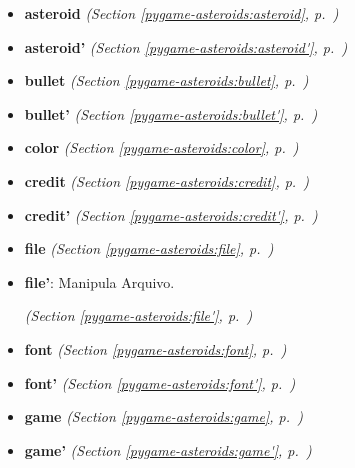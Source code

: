 \begin{itemize}
\setlength{\parskip}{0ex}
\item \textbf{asteroid}
  \textit{(Section \ref{pygame-asteroids:asteroid}, p.~\pageref{pygame-asteroids:asteroid})}

\item \textbf{asteroid'}
  \textit{(Section \ref{pygame-asteroids:asteroid'}, p.~\pageref{pygame-asteroids:asteroid'})}

\item \textbf{bullet}
  \textit{(Section \ref{pygame-asteroids:bullet}, p.~\pageref{pygame-asteroids:bullet})}

\item \textbf{bullet'}
  \textit{(Section \ref{pygame-asteroids:bullet'}, p.~\pageref{pygame-asteroids:bullet'})}

\item \textbf{color}
  \textit{(Section \ref{pygame-asteroids:color}, p.~\pageref{pygame-asteroids:color})}

\item \textbf{credit}
  \textit{(Section \ref{pygame-asteroids:credit}, p.~\pageref{pygame-asteroids:credit})}

\item \textbf{credit'}
  \textit{(Section \ref{pygame-asteroids:credit'}, p.~\pageref{pygame-asteroids:credit'})}

\item \textbf{file}
  \textit{(Section \ref{pygame-asteroids:file}, p.~\pageref{pygame-asteroids:file})}

\item \textbf{file'}: Manipula Arquivo.



  \textit{(Section \ref{pygame-asteroids:file'}, p.~\pageref{pygame-asteroids:file'})}

\item \textbf{font}
  \textit{(Section \ref{pygame-asteroids:font}, p.~\pageref{pygame-asteroids:font})}

\item \textbf{font'}
  \textit{(Section \ref{pygame-asteroids:font'}, p.~\pageref{pygame-asteroids:font'})}

\item \textbf{game}
  \textit{(Section \ref{pygame-asteroids:game}, p.~\pageref{pygame-asteroids:game})}

\item \textbf{game'}
  \textit{(Section \ref{pygame-asteroids:game'}, p.~\pageref{pygame-asteroids:game'})}


\end{itemize}
